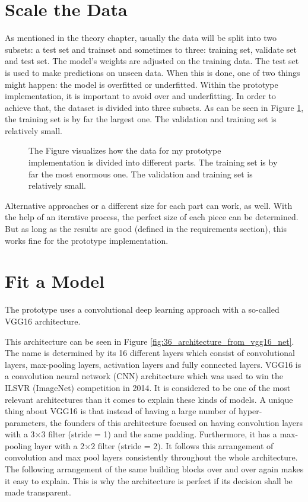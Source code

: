 \section{Scale the Data}
\label{sec:Scaling_the_data}

As mentioned in the theory chapter, usually the data will be split into two subsets: a test set and trainset and sometimes to three: training set, validate set and test set. The model's weights are adjusted on the training data. The test set is used to make predictions on unseen data. When this is done, one of two things might happen: the model is overfitted or underfitted. Within the prototype implementation, it is important to avoid over and underfitting. In order to achieve that, the dataset is divided into three subsets. As can be seen in Figure \ref{fig:48_pie_chart}, the training set is by far the largest one. The validation and training set is relatively small. 

\begin{figure}[htp]
	\centering
	\caption{
		The Figure visualizes how the data for my prototype implementation is divided into different parts. The training set is by far the most enormous one. The validation and training set is relatively small. 
	}
	\label{fig:48_pie_chart}
\end{figure}

Alternative approaches or a different size for each part can work, as well. With the help of an iterative process, the perfect size of each piece can be determined. But as long as the results are good (defined in the requirements section), this works fine for the prototype implementation. 

\section{Fit a Model}
\label{sec:fit_a_model}

The prototype uses a convolutional deep learning approach with a so-called VGG16 architecture. 

This architecture can be seen in Figure \ref{fig:36_architecture_from_vgg16_net}. The name is determined by its 16 different layers which consist of convolutional layers, max-pooling layers, activation layers and fully connected layers. VGG16 is a convolution neural network (CNN) architecture which was used to win the ILSVR (ImageNet) competition in 2014. It is considered to be one of the most relevant architectures than it comes to explain these kinds of models. A unique thing about VGG16 is that instead of having a large number of hyper-parameters, the founders of this architecture focused on having convolution layers with a 3\(\times\)3 filter (stride = 1) and the same padding.
Furthermore, it has a max-pooling layer with a 2\(\times\)2 filter (stride = 2). It follows this arrangement of convolution and max pool layers consistently throughout the whole architecture. The following arrangement of the same building blocks over and over again makes it easy to explain. This is why the architecture is perfect if its decision shall be made transparent. 

